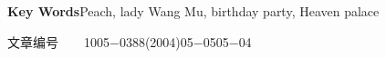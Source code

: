 \documentclass[a4paper,11pt,onecolumn,twoside]{article}
\begin{document}
\begin{CJK*}{GBK}{song}
\begin{center}
{{{\textbf{Key Words}\quad Peach, lady Wang Mu, birthday party, Heaven palace}}
}
\end{center}
\begin{minipage}[c]{10cm}
\vspace{-35.5cm}
文章编号~~~~1005$-$0388(2004)05$-$0505$-$04
\end{minipage}
\setlength{\oddsidemargin}{-.5cm}  %
\setlength{\evensidemargin}{\oddsidemargin}
\setlength{\textwidth}{17.00cm}
\begin{multicols}{2}

\end{multicols}
\end{CJK*}
\end{document}
